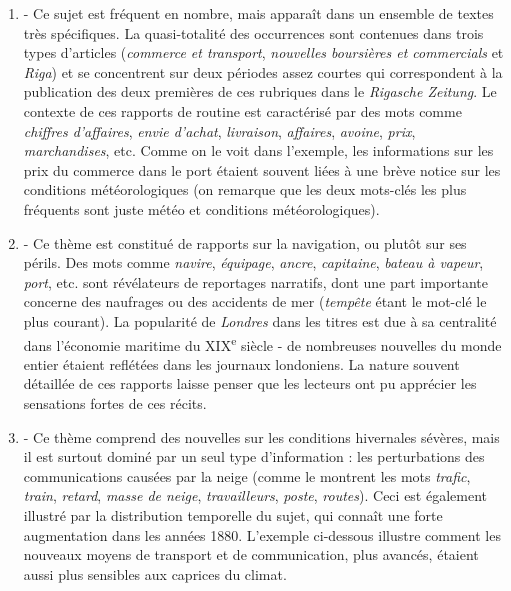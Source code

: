 \documentclass[a4paper,twoside,12pt]{article}
\begin{document}
\begin{enumerate}
    \item \textbf{} - Ce sujet est fréquent en nombre, mais apparaît dans un ensemble de textes très spécifiques. La quasi-totalité des occurrences sont contenues dans trois types d'articles (\textit{commerce et transport}, \textit{nouvelles boursières et commercials} et \textit{Riga}) et se concentrent sur deux périodes assez courtes qui correspondent à la publication des deux premières de ces rubriques dans le \textit{Rigasche Zeitung}. Le contexte de ces rapports de routine est caractérisé par des mots comme \textit{chiffres d'affaires}, \textit{envie d'achat}, \textit{livraison}, \textit{affaires}, \textit{avoine}, \textit{prix}, \textit{marchandises}, etc. Comme on le voit dans l'exemple, les informations sur les prix du commerce dans le port étaient souvent liées à une brève notice sur les conditions météorologiques (on remarque que les deux mots-clés les plus fréquents sont juste météo et conditions météorologiques).

    \item \textbf{} - Ce thème est constitué de rapports sur la navigation, ou plutôt sur ses périls. Des mots comme \textit{navire}, \textit{équipage}, \textit{ancre}, \textit{capitaine}, \textit{bateau à vapeur}, \textit{port}, etc. sont révélateurs de reportages narratifs, dont une part importante concerne des naufrages ou des accidents de mer (\textit{tempête} étant le mot-clé le plus courant). La popularité de \textit{Londres} dans les titres est due à sa centralité dans l'économie maritime du XIX\textsuperscript{e} siècle - de nombreuses nouvelles du monde entier étaient reflétées dans les journaux londoniens. La nature souvent détaillée de ces rapports laisse penser que les lecteurs ont pu apprécier les sensations fortes de ces récits.
    
    \item \textbf{} - Ce thème comprend des nouvelles sur les conditions hivernales sévères, mais il est surtout dominé par un seul type d'information : les perturbations des communications causées par la neige (comme le montrent les mots \textit{trafic}, \textit{train}, \textit{retard}, \textit{masse de neige}, \textit{travailleurs}, \textit{poste}, \textit{routes}). Ceci est également illustré par la distribution temporelle du sujet, qui connaît une forte augmentation dans les années 1880. L'exemple ci-dessous illustre comment les nouveaux moyens de transport et de communication, plus avancés, étaient aussi plus sensibles aux caprices du climat.
    

\end{enumerate}
\end{document}
